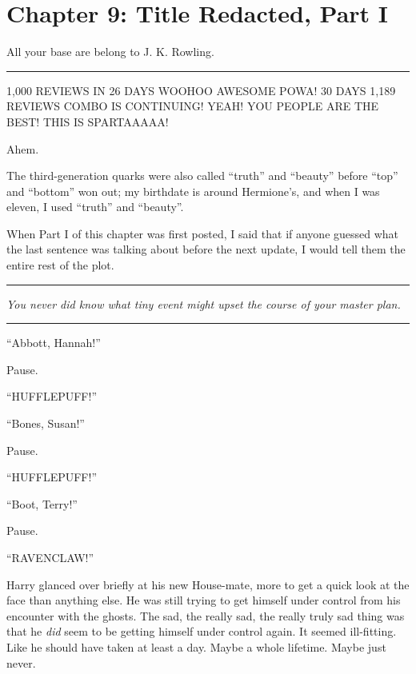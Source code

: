 \chapter{Chapter 9: Title Redacted, Part I}
All your base are belong to J. K. Rowling.

\begin{center}\rule{3in}{0.4pt}\end{center}

1,000 REVIEWS IN 26 DAYS WOOHOO AWESOME POWA! 30 DAYS 1,189 REVIEWS
COMBO IS CONTINUING! YEAH! YOU PEOPLE ARE THE BEST! THIS IS SPARTAAAAA!

Ahem.

The third-generation quarks were also called ``truth'' and ``beauty''
before ``top'' and ``bottom'' won out; my birthdate is around
Hermione's, and when I was eleven, I used ``truth'' and ``beauty''.

When Part I of this chapter was first posted, I said that if anyone
guessed what the last sentence was talking about before the next update,
I would tell them the entire rest of the plot.

\begin{center}\rule{3in}{0.4pt}\end{center}

\emph{You never did know what tiny event might upset the course of your
master plan.}

\begin{center}\rule{3in}{0.4pt}\end{center}

``Abbott, Hannah!''

Pause.

``HUFFLEPUFF!''

``Bones, Susan!''

Pause.

``HUFFLEPUFF!''

``Boot, Terry!''

Pause.

``RAVENCLAW!''

Harry glanced over briefly at his new House-mate, more to get a quick
look at the face than anything else. He was still trying to get himself
under control from his encounter with the ghosts. The sad, the really
sad, the really truly sad thing was that he \emph{did} seem to be
getting himself under control again. It seemed ill-fitting. Like he
should have taken at least a day. Maybe a whole lifetime. Maybe just
never.

